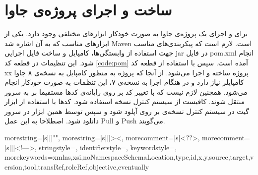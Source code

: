 \section{ساخت و اجرای پروژه‌ی جاوا}
برای  و اجرای یک پروژه‌ی جاوا به صورت خودکار ابزارهای مختلفی وجود دارد. یکی از ابزارهای مناسب که به آن اشاره شد Maven است. لازم است که پیکربندی‌های مناسب جهت استفاده از وابستگی‌ها، کامپایل و ساخت فایل اجرایی jar  در فایل pom.xml انجام شود. این تنظیمات در قطعه کد \ref{code:pom} آمده است. سپس با استفاده از قطعه کد xx پروژه ساخته و اجرا می‌شود. از آنجا که پروژه به منظور کامپایل به نسخه‌ی ۸ جاوا کامپایلر نیاز دارد و در هنگام اجرا به نسخه‌ی ۷، این تنظمات به صورت خودکار انجام می‌شود. همچنین لازم نیست که با تغییر کد بر روی رایانه‌ی   کدها مستقیما بر به سرور منتقل شوند. کافیست از سیستم کنترل نسخه استفاده شود. کدها  با استفاده از ابزار گیت در سیستم کنترل نسخه‌ی بر روی  آپلود شود و سپس توسط همین ابزار در سرور دانلود شود. اصطلاحا به این عمل Pull و Push می‌گویند.

{
	morestring=[s][\color{mauve}]{"}{"},
	morestring=[s][\color{black}]{>}{<},
	morecomment=[s]{<?}{?>},
	morecomment=[s][\color{dkgreen}]{<!--}{-->},
	stringstyle=\color{black},
	identifierstyle=\color{lightblue},
	keywordstyle=\color{red},
	morekeywords={xmlns,xsi,noNamespaceSchemaLocation,type,id,x,y,source,target,version,tool,transRef,roleRef,objective,eventually}%
}

